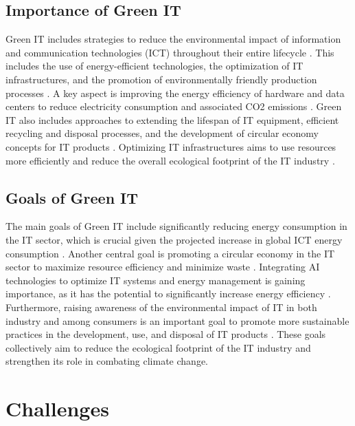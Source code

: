 \documentclass[10pt,twocolumn,conference]{IEEEtran}
\begin{document}
\subsection{Importance of Green IT}
Green IT includes strategies to reduce the environmental impact of information and communication technologies (ICT) throughout their entire lifecycle \cite{murugesan2008}. This includes the use of energy-efficient technologies, the optimization of IT infrastructures, and the promotion of environmentally friendly production processes \cite{tomlinson2010}. A key aspect is improving the energy efficiency of hardware and data centers to reduce electricity consumption and associated CO2 emissions \cite{gartner2007}. Green IT also includes approaches to extending the lifespan of IT equipment, efficient recycling and disposal processes, and the development of circular economy concepts for IT products \cite{geissdoerfer2010}. Optimizing IT infrastructures aims to use resources more efficiently and reduce the overall ecological footprint of the IT industry \cite{jenkin2011}.

\subsection{Goals of Green IT}
The main goals of Green IT include significantly reducing energy consumption in the IT sector, which is crucial given the projected increase in global ICT energy consumption \cite{andrae2015}. Another central goal is promoting a circular economy in the IT sector to maximize resource efficiency and minimize waste \cite{geissdoerfer2010}. Integrating AI technologies to optimize IT systems and energy management is gaining importance, as it has the potential to significantly increase energy efficiency \cite{khan2021}. Furthermore, raising awareness of the environmental impact of IT in both industry and among consumers is an important goal to promote more sustainable practices in the development, use, and disposal of IT products \cite{jenkin2011}. These goals collectively aim to reduce the ecological footprint of the IT industry and strengthen its role in combating climate change.

\section{Challenges}
\end{document}
